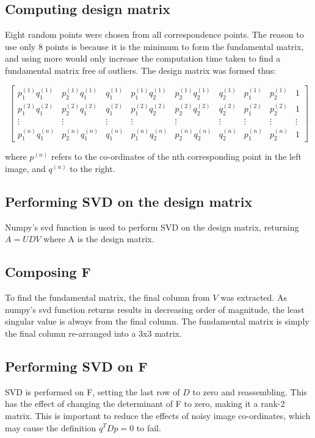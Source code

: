 \documentclass[10pt,a4paper]{article}
\begin{document}
\subsection*{Computing design matrix}
Eight random points were chosen from all correspondence points. The reason to use only 8 points is because it is the minimum to form the fundamental matrix, and using more would only increase the computation time taken to find a fundamental matrix free of outliers. The design matrix was formed thus:

\begin{equation}
	\begin{bmatrix}
		p_1^{(1)}q_1^{(1)} & p_2^{(1)}q_1^{(1)} & q_1^{(1)} & p_1^{(1)}q_2^{(1)} & p_2^{(1)}q_2^{(1)} & q_2^{(1)} & p_1^{(1)} & p_2^{(1)} & 1\\
		p_1^{(2)}q_1^{(2)} & p_2^{(2)}q_1^{(2)} & q_1^{(2)} & p_1^{(2)}q_2^{(2)} & p_2^{(2)}q_2^{(2)} & q_2^{(2)} & p_1^{(2)} & p_2^{(2)} & 1\\
		\vdots & \vdots & \vdots & \vdots & \vdots & \vdots & \vdots & \vdots & \vdots\\
		p_1^{(n)}q_1^{(n)} & p_2^{(n)}q_1^{(n)} & q_1^{(n)} & p_1^{(n)}q_2^{(n)} & p_2^{(n)}q_2^{(n)} & q_2^{(n)} & p_1^{(n)} & p_2^{(n)} & 1
	\end{bmatrix}
\end{equation}

where $p^{(n)}$ refers to the co-ordinates of the nth corresponding point in the left image, and $q^{(n)}$ to the right.

\subsection*{Performing SVD on the design matrix}
Numpy's svd function is used to perform SVD on the design matrix, returning $A=UDV$ where A is the design matrix.

\subsection*{Composing F}
To find the fundamental matrix, the final column from $V$ was extracted. As numpy's svd function returns results in decreasing order of magnitude, the least singular value is always from the final column. The fundamental matrix is simply the final column re-arranged into a 3x3 matrix.

\subsection*{Performing SVD on F}
SVD is performed on F, setting the last row of $D$ to zero and reassembling. This has the effect of changing the determinant of F to zero, making it a rank-2 matrix. This is important to reduce the effects of noisy image co-ordinates, which may cause the definition $q^TDp = 0$ to fail.
\end{document}
